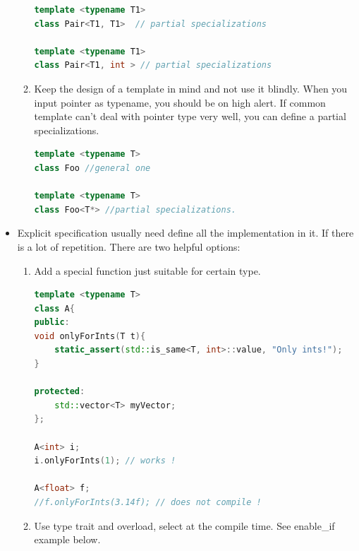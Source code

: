 \documentclass[a4paper,11pt,twoside]{book}
\begin{document}
\begin{itemize}
\begin{enumerate}
\begin{lstlisting}[frame=single, language=c++]
template <typename T1>
class Pair<T1, T1>  // partial specializations

template <typename T1>
class Pair<T1, int > // partial specializations
\end{lstlisting}

\item Keep the design of a template in mind and not use it blindly. When you input pointer as typename, you should be on high alert. If common template can't deal with pointer type very well, you can define a partial specializations.
\begin{lstlisting}[frame=single, language=c++]
template <typename T>
class Foo //general one

template <typename T>
class Foo<T*> //partial specializations.
\end{lstlisting}

\end{enumerate}

\item Explicit specification usually need define all the implementation in it. If there is a lot of repetition. There are two helpful options: 
\begin{enumerate}
	\item Add a special function just suitable for certain type. 
\begin{lstlisting}[frame=single, language=c++]
template <typename T>
class A{
public:
void onlyForInts(T t){
	static_assert(std::is_same<T, int>::value, "Only ints!");
}

protected:
	std::vector<T> myVector;
};

A<int> i;
i.onlyForInts(1); // works !

A<float> f;
//f.onlyForInts(3.14f); // does not compile !
\end{lstlisting}

\item Use type trait and overload, select at the compile time. See enable\_if example below.

\end{enumerate}


\end{itemize}
\end{document}
